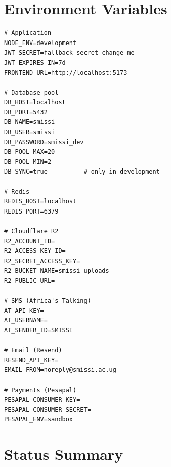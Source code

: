 \documentclass[11pt, a4paper]{article}
\begin{document}
\section{Environment Variables}

\begin{lstlisting}
# Application
NODE_ENV=development
JWT_SECRET=fallback_secret_change_me
JWT_EXPIRES_IN=7d
FRONTEND_URL=http://localhost:5173

# Database pool
DB_HOST=localhost
DB_PORT=5432
DB_NAME=smissi
DB_USER=smissi
DB_PASSWORD=smissi_dev
DB_POOL_MAX=20
DB_POOL_MIN=2
DB_SYNC=true          # only in development

# Redis
REDIS_HOST=localhost
REDIS_PORT=6379

# Cloudflare R2
R2_ACCOUNT_ID=
R2_ACCESS_KEY_ID=
R2_SECRET_ACCESS_KEY=
R2_BUCKET_NAME=smissi-uploads
R2_PUBLIC_URL=

# SMS (Africa's Talking)
AT_API_KEY=
AT_USERNAME=
AT_SENDER_ID=SMISSI

# Email (Resend)
RESEND_API_KEY=
EMAIL_FROM=noreply@smissi.ac.ug

# Payments (Pesapal)
PESAPAL_CONSUMER_KEY=
PESAPAL_CONSUMER_SECRET=
PESAPAL_ENV=sandbox
\end{lstlisting}

\section{Status Summary}
\end{document}
